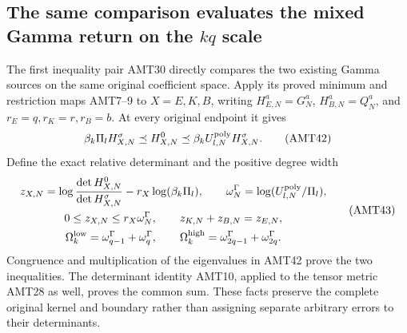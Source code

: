 \documentclass[11pt,a4paper]{article}
\begin{document}
\subsection{The same comparison evaluates the mixed Gamma return on the \texorpdfstring{$kq$}{kq} scale}
The first inequality pair AMT30 directly compares the two existing
Gamma sources on the same original coefficient space. Apply its
proved minimum and restriction maps AMT7--9 to $X=E,K,B$, writing
$H_{E,N}^a=G_N^a$, $H_{B,N}^a=Q_N^a$, and
$r_E=q,r_K=r,r_B=b$. At every original endpoint it gives
\[
 \beta_k\Pi_l H_{X,N}^\sigma\preceq H_{X,N}^0
       \preceq\beta_k U_{l,N}^{\rm poly}H_{X,N}^\sigma.
 \tag{AMT42}
\]
Define the exact relative determinant and the positive degree width
\[
\begin{gathered}
 z_{X,N}=\log\frac{\det H_{X,N}^0}{\det H_{X,N}^\sigma}
                              -r_X\log(\beta_k\Pi_l),\qquad
 \omega_N^\Gamma=\log(U_{l,N}^{\rm poly}/\Pi_l),\\
 0\le z_{X,N}\le r_X\omega_N^\Gamma,\qquad
 z_{K,N}+z_{B,N}=z_{E,N},\\
 \Omega_k^{\rm low}=\omega_{q-1}^\Gamma+\omega_q^\Gamma,\qquad
 \Omega_k^{\rm high}=\omega_{2q-1}^\Gamma+\omega_{2q}^\Gamma.
\end{gathered}\tag{AMT43}
\]
Congruence and multiplication of the eigenvalues in AMT42 prove
the two inequalities. The determinant identity AMT10, applied to
the tensor metric AMT28 as well, proves the common sum. These
facts preserve the complete original kernel and boundary rather
than assigning separate arbitrary errors to their determinants.
\end{document}
